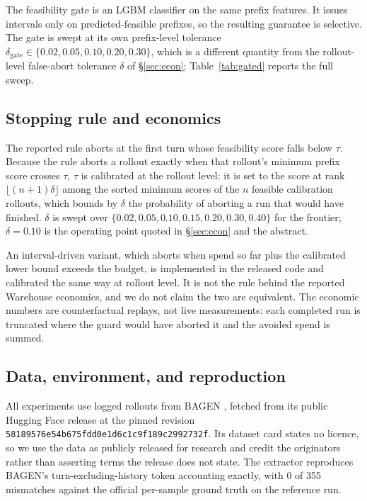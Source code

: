 \documentclass{article}
\begin{document}
The feasibility gate is an LGBM classifier on the same prefix features. It issues
intervals only on predicted-feasible prefixes, so the resulting guarantee is selective.
The gate is swept at its own prefix-level tolerance $\delta_{\mathrm{gate}} \in
\{0.02, 0.05, 0.10, 0.20, 0.30\}$, which is a different quantity from the rollout-level
false-abort tolerance $\delta$ of \S\ref{sec:econ}; Table~\ref{tab:gated} reports the full
sweep.

\subsection{Stopping rule and economics}

The reported rule aborts at the first turn whose feasibility score falls below $\tau$.
Because the rule aborts a rollout exactly when that rollout's minimum prefix score
crosses $\tau$, $\tau$ is calibrated at the rollout level: it is set to the score at
rank $\lfloor (n+1)\delta \rfloor$ among the sorted minimum scores of the $n$ feasible
calibration rollouts, which bounds by $\delta$ the probability of aborting a run that
would have finished. $\delta$ is swept over $\{0.02, 0.05, 0.10, 0.15, 0.20, 0.30,
0.40\}$ for the frontier; $\delta{=}0.10$ is the operating point quoted in
\S\ref{sec:econ} and the abstract.

An interval-driven variant, which aborts when spend so far plus the calibrated lower
bound exceeds the budget, is implemented in the released code and calibrated the same
way at rollout level. It is not the rule behind the reported Warehouse economics, and
we do not claim the two are equivalent. The economic numbers are counterfactual
replays, not live measurements: each completed run is truncated where the guard would
have aborted it and the avoided spend is summed.

\subsection{Data, environment, and reproduction}

All experiments use logged rollouts from BAGEN \cite{lin2026bagen}, fetched from its
public Hugging Face release at the pinned revision
\texttt{58189576e54b675fdd0e1d6c1c9f189c2992732f}. Its dataset card states no licence,
so we use the data as publicly released for research and credit the originators rather
than asserting terms the release does not state. The extractor reproduces BAGEN's
turn-excluding-history token accounting exactly, with 0 of 355 mismatches against the
official per-sample ground truth on the reference run.
\end{document}
